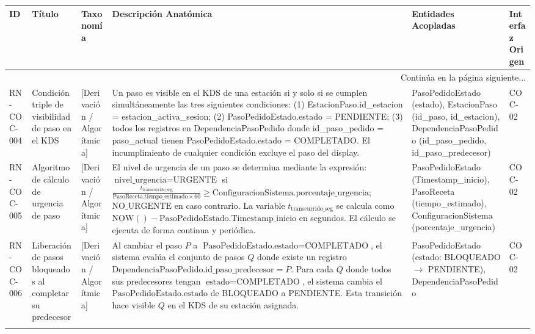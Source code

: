 \begin{landscape}
\begin{longtable}[c]{l p{2.1cm} p{2.1cm} p{8cm} p{4cm} p{3cm}}
\toprule
\textbf{ID} & \textbf{Título} & \textbf{Taxonomía} & \textbf{Descripción Anatómica} & \textbf{Entidades Acopladas} & \textbf{Interfaz Origen} \\
\midrule
\endhead

\midrule
\multicolumn{6}{r}{\small Continúa en la página siguiente...} \\
\endfoot
\bottomrule
\endlastfoot

RN-COC-004 & Condición triple de visibilidad de paso en el KDS & [Derivación / Algorítmica] & Un paso es visible en el KDS de una estación si y solo si se cumplen simultáneamente las tres siguientes condiciones: (1) EstacionPaso.id\_estacion = estacion\_activa\_sesion; (2) PasoPedidoEstado.estado = PENDIENTE; (3) todos los registros en DependenciaPasoPedido donde id\_paso\_pedido = paso\_actual tienen PasoPedidoEstado.estado = COMPLETADO. El incumplimiento de cualquier condición excluye el paso del display. & PasoPedidoEstado (estado), EstacionPaso (id\_paso, id\_estacion), DependenciaPasoPedido (id\_paso\_pedido, id\_paso\_predecesor) & COC-02 \\
\addlinespace
RN-COC-005 & Algoritmo de cálculo de urgencia de paso & [Derivación / Algorítmica] & El nivel de urgencia de un paso se determina mediante la expresión: $\text{nivel\_urgencia} = \text{URGENTE}$ si $\frac{t_{\text{transcurrido\_seg}}}{\text{PasoReceta.tiempo\_estimado} \times 60} \ge \text{ConfiguracionSistema.porcentaje\_urgencia}$; $\text{NO\_URGENTE}$ en caso contrario. La variable $t_{\text{transcurrido\_seg}}$ se calcula como $\text{NOW}() - \text{PasoPedidoEstado.Timestamp\_inicio}$ en segundos. El cálculo se ejecuta de forma continua y periódica. & PasoPedidoEstado (Timestamp\_inicio), PasoReceta (tiempo\_estimado), ConfiguracionSistema (porcentaje\_urgencia) & COC-02 \\
\addlinespace
RN-COC-006 & Liberación de pasos bloqueados al completar su predecesor & [Derivación / Algorítmica] & Al cambiar el paso $P$ a $\text{PasoPedidoEstado.estado} = \text{COMPLETADO}$, el sistema evalúa el conjunto de pasos $Q$ donde existe un registro $\text{DependenciaPasoPedido.id\_paso\_predecesor} = P$. Para cada $Q$ donde todos sus predecesores tengan $\text{estado} = \text{COMPLETADO}$, el sistema cambia el $\text{PasoPedidoEstado.estado}$ de BLOQUEADO a PENDIENTE. Esta transición hace visible $Q$ en el KDS de su estación asignada. & PasoPedidoEstado (estado: BLOQUEADO $\rightarrow$ PENDIENTE), DependenciaPasoPedido & COC-02 \\
\addlinespace

\end{longtable}
\end{landscape}
